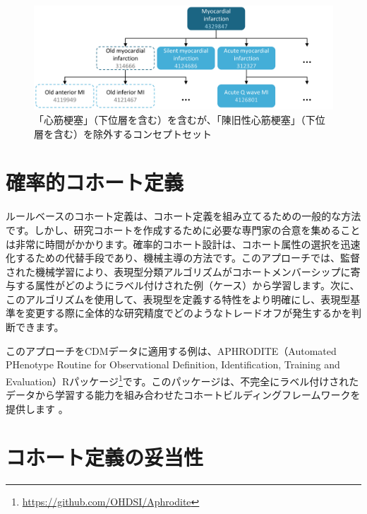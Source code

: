 \documentclass[
  11pt]{book}
\theoremstyle{definition}
\theoremstyle{definition}
\theoremstyle{definition}
\theoremstyle{definition}
\theoremstyle{remark}
\begin{document}
\begin{figure}

{\centering \includegraphics[width=1\linewidth]{images/Cohorts/conceptSet} 

}

\caption{「心筋梗塞」（下位層を含む）を含むが、「陳旧性心筋梗塞」（下位層を含む）を除外するコンセプトセット}\label{fig:conceptSet}
\end{figure}

\section{確率的コホート定義}\label{ux78baux7387ux7684ux30b3ux30dbux30fcux30c8ux5b9aux7fa9}

ルールベースのコホート定義は、コホート定義を組み立てるための一般的な方法です。しかし、研究コホートを作成するために必要な専門家の合意を集めることは非常に時間がかかります。確率的コホート設計は、コホート属性の選択を迅速化するための代替手段であり、機械主導の方法です。このアプローチでは、監督された機械学習により、表現型分類アルゴリズムがコホートメンバーシップに寄与する属性がどのようにラベル付けされた例（ケース）から学習します。次に、このアルゴリズムを使用して、表現型を定義する特性をより明確にし、表現型基準を変更する際に全体的な研究精度でどのようなトレードオフが発生するかを判断できます。 

このアプローチをCDMデータに適用する例は、APHRODITE（Automated PHenotype Routine for Observational Definition, Identification, Training and Evaluation）Rパッケージ\footnote{\url{https://github.com/OHDSI/Aphrodite}}です。このパッケージは、不完全にラベル付けされたデータから学習する能力を組み合わせたコホートビルディングフレームワークを提供します \citep{Banda2017APHRODITE} 。

\section{コホート定義の妥当性}\label{ux30b3ux30dbux30fcux30c8ux5b9aux7fa9ux306eux59a5ux5f53ux6027}
\end{document}
